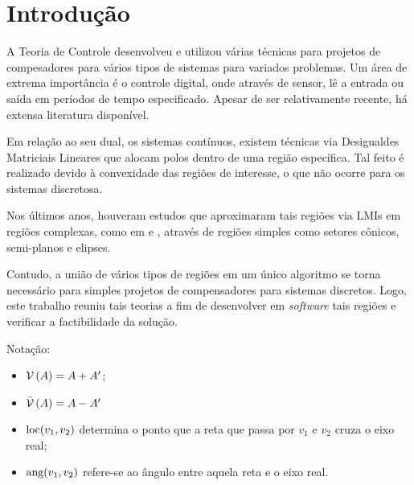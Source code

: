 \chapter{Introdução}
A Teoria de Controle desenvolveu e utilizou várias técnicas para projetos de compesadores para vários tipos de sistemas para variados problemas. Um área de extrema importância é o controle digital, onde através de sensor, lê a entrada ou saída em períodos de tempo especificado. Apesar de ser relativamente recente, há extensa literatura disponível.

Em relação ao seu dual, os sistemas contínuos, existem técnicas via Desigualdes Matriciais Lineares que alocam polos dentro de uma região específica. Tal feito é realizado devido à convexidade das regiões de interesse, o que não ocorre para os sistemas discretosa.

Nos últimos anos, houveram estudos que aproximaram tais regiões via LMIs em regiões complexas, como em  e , através de regiões simples como setores cônicos, semi-planos e elipses.

Contudo, a união de vários tipos de regiões em um único algoritmo se torna necessário para simples projetos de compensadores para sistemas discretos. Logo, este trabalho reuniu tais teorias a fim de desenvolver em \emph{software} tais regiões e verificar a factibilidade da solução.

Notação:
\begin{itemize}
  \item $\operatorname{\mathcal{V}}{(A)} = A + A'$;
  \item $\operatorname{\mathcal{\bar{V}}}{(A)} = A - A'$
  \item $\operatorname{loc}(v_1, v_2)$ determina o ponto que a reta que passa por $v_1$ e $v_2$ cruza o eixo real;
  \item $\operatorname{ang}(v_1, v_2)$ refere-se ao ângulo entre aquela reta e o eixo real.
\end{itemize}
